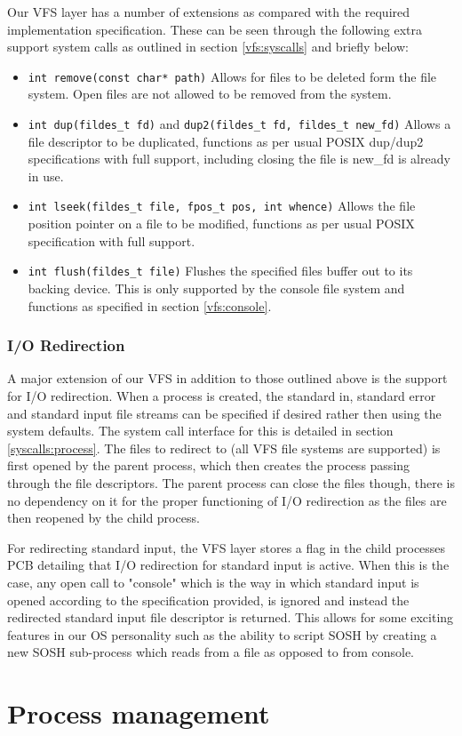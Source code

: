 \documentclass[12pt,english]{article}
\begin{document}
Our VFS layer has a number of extensions as compared with the required implementation specification. These can be seen through the following extra support system calls as outlined in section \ref{vfs:syscalls} and briefly below:

\begin{itemize}
\item \texttt{int remove(const char* path)} Allows for files to be deleted form the file system. Open files are not allowed to be removed from the system.
\item \texttt{int dup(fildes\_t fd)} and \texttt{dup2(fildes\_t fd, fildes\_t new\_fd)} Allows a file descriptor to be duplicated, functions as per usual POSIX dup/dup2 specifications with full support, including closing the file is new\_fd is already in use.
\item \texttt{int lseek(fildes\_t file, fpos\_t pos, int whence)} Allows the file position pointer on a file to be modified, functions as per usual POSIX specification with full support.
\item \texttt{int flush(fildes\_t file)} Flushes the specified files buffer out to its backing device. This is only supported by the console file system and functions as specified in section \ref{vfs:console}.
\end{itemize}

\subsubsection{I/O Redirection} \label{vfs:redirect}

A major extension of our VFS in addition to those outlined above is the support for I/O redirection. When a process is created, the standard in, standard error and standard input file streams can be specified if desired rather then using the system defaults. The system call interface for this is detailed in section \ref{syscalls:process}. The files to redirect to (all VFS file systems are supported) is first opened by the parent process, which then creates the process passing through the file descriptors. The parent process can close the files though, there is no dependency on it for the proper functioning of I/O redirection as the files are then reopened by the child process.

For redirecting standard input, the VFS layer stores a flag in the child processes PCB detailing that I/O redirection for standard input is active. When this is the case, any open call to "console" which is the way in which standard input is opened according to the specification provided, is ignored and instead the redirected standard input file descriptor is returned. This allows for some exciting features in our OS personality such as the ability to script SOSH by creating a new SOSH sub-process which reads from a file as opposed to from console.



\section{Process management}
\end{document}
